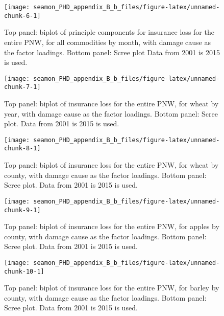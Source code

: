 \documentclass[]{article}
\begin{document}
\begin{figure}

{\centering \texttt{[image: seamon\_PHD\_appendix\_B\_b\_files/figure-latex/unnamed-chunk-6-1]} 

}

\caption{Top panel: biplot of principle components for insurance loss for the entire PNW, for all commodities by month, with damage cause as the factor loadings.  Bottom panel: Scree plot Data from 2001 is 2015 is used.}\label{fig:unnamed-chunk-6}
\end{figure}
\newpage

\begin{figure}

{\centering \texttt{[image: seamon\_PHD\_appendix\_B\_b\_files/figure-latex/unnamed-chunk-7-1]} 

}

\caption{Top panel: biplot of insurance loss for the entire PNW, for wheat by year, with damage cause as the factor loadings. Bottom panel: Scree plot. Data from 2001 is 2015 is used.}\label{fig:unnamed-chunk-7}
\end{figure}
\newpage

\begin{figure}

{\centering \texttt{[image: seamon\_PHD\_appendix\_B\_b\_files/figure-latex/unnamed-chunk-8-1]} 

}

\caption{Top panel: biplot of insurance loss for the entire PNW, for wheat by county, with damage cause as the factor loadings. Bottom panel: Scree plot. Data from 2001 is 2015 is used.}\label{fig:unnamed-chunk-8}
\end{figure}
\newpage

\begin{figure}

{\centering \texttt{[image: seamon\_PHD\_appendix\_B\_b\_files/figure-latex/unnamed-chunk-9-1]} 

}

\caption{Top panel: biplot of insurance loss for the entire PNW, for apples by county, with damage cause as the factor loadings.  Bottom panel: Scree plot. Data from 2001 is 2015 is used.}\label{fig:unnamed-chunk-9}
\end{figure}

\newpage

\begin{figure}

{\centering \texttt{[image: seamon\_PHD\_appendix\_B\_b\_files/figure-latex/unnamed-chunk-10-1]} 

}

\caption{Top panel: biplot of insurance loss for the entire PNW, for barley by county, with damage cause as the factor loadings.  Bottom panel: Scree plot. Data from 2001 is 2015 is used.}\label{fig:unnamed-chunk-10}
\end{figure}
\end{document}
